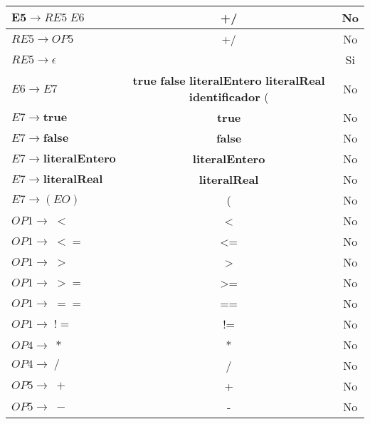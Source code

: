 \begin{table}[h]
\begin{tabular}{l|c|c}
        $\textbf{E5} \longrightarrow RE5\;E6$ & +\;\-/ & No \\
        \hline
        $RE5 \longrightarrow OP5$ & +\;\-/ & No \\
        \hline
        $RE5 \longrightarrow \epsilon$ & & Si \\ \hline
        $E6 \longrightarrow E7$ &  \textbf{true} \textbf{false} \textbf{literalEntero} \textbf{literalReal}
            \textbf{identificador} ( & No  \\ \hline
        $E7 \longrightarrow \textbf{true}$ &  \textbf{true} & No  \\ \hline
        $E7 \longrightarrow \textbf{false}$ &  \textbf{false} & No  \\ \hline
        $E7 \longrightarrow \textbf{literalEntero}$ &  \textbf{literalEntero} & No  \\ \hline
        $E7 \longrightarrow \textbf{literalReal}$ &  \textbf{literalReal} & No \\ \hline
        $E7 \longrightarrow (EO)$ & ( & No \\ \hline
        $OP1 \longrightarrow \;<$ & < & No \\ \hline
        $OP1 \longrightarrow \;<=$ & <= & No \\ \hline
        $OP1 \longrightarrow \;>$ & > & No \\ \hline
        $OP1 \longrightarrow \;>=$ & >= & No \\ \hline
        $OP1 \longrightarrow \;==$ & == & No \\ \hline
        $OP1 \longrightarrow \;!=$ & != & No \\ \hline
        $OP4 \longrightarrow \;*$ & * & No \\ \hline
        $OP4 \longrightarrow \;/$ & / & No \\ \hline
        $OP5 \longrightarrow \;+$ & + & No \\ \hline
        $OP5 \longrightarrow \;-$ & - & No \\ \hline
	\end{tabular}
	\label{tab:tablaDirectores}
\end{table}